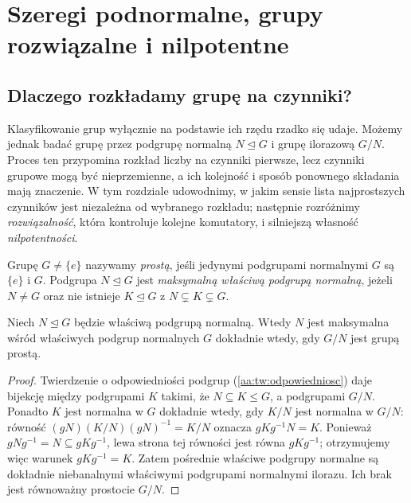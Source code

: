 \chapter[Szeregi podnormalne i nilpotentność]{Szeregi podnormalne, grupy rozwiązalne i nilpotentne}
\label{aa:ch:szeregi}

\section{Dlaczego rozkładamy grupę na czynniki?}
Klasyfikowanie grup wyłącznie na podstawie ich rzędu rzadko się udaje.
Możemy jednak badać grupę przez podgrupę normalną $N\trianglelefteq G$
i grupę ilorazową $G/N$. Proces ten przypomina rozkład liczby
na czynniki pierwsze, lecz czynniki grupowe mogą być nieprzemienne,
a ich kolejność i sposób ponownego składania mają znaczenie.
W tym rozdziale udowodnimy, w jakim sensie lista najprostszych czynników
jest niezależna od wybranego rozkładu; następnie rozróżnimy
\emph{rozwiązalność}, która kontroluje kolejne komutatory,
i silniejszą własność \emph{nilpotentności}.

\begin{definicja}
\label{aa:def:prosta}
Grupę $G\ne\{e\}$ nazywamy \emph{prostą}, jeśli jedynymi
podgrupami normalnymi $G$ są $\{e\}$ i $G$.
Podgrupa $N\trianglelefteq G$ jest \emph{maksymalną właściwą podgrupą
normalną}, jeżeli $N\ne G$ oraz nie istnieje
$K\trianglelefteq G$ z $N\subsetneq K\subsetneq G$.
\end{definicja}
\begin{lemat}
\label{aa:lem:maxnormal}
Niech $N\trianglelefteq G$ będzie właściwą podgrupą normalną.
Wtedy $N$ jest maksymalna wśród właściwych podgrup normalnych $G$
dokładnie wtedy, gdy $G/N$ jest grupą prostą.
\end{lemat}
\begin{proof}
Twierdzenie o odpowiedniości podgrup
(\ref{aa:tw:odpowiedniosc}) daje bijekcję między podgrupami
$K$ takimi, że $N\subseteq K\le G$, a podgrupami $G/N$.
Ponadto $K$ jest normalna w $G$ dokładnie wtedy, gdy
$K/N$ jest normalna w $G/N$: równość
$(gN)(K/N)(gN)^{-1}=K/N$ oznacza $gKg^{-1}N=K$.
Ponieważ $gNg^{-1}=N\subseteq gKg^{-1}$, lewa strona
tej równości jest równa $gKg^{-1}$; otrzymujemy więc
warunek $gKg^{-1}=K$.
Zatem pośrednie właściwe podgrupy normalne są dokładnie
niebanalnymi właściwymi podgrupami normalnymi ilorazu.
Ich brak jest równoważny prostocie $G/N$.
\end{proof}

